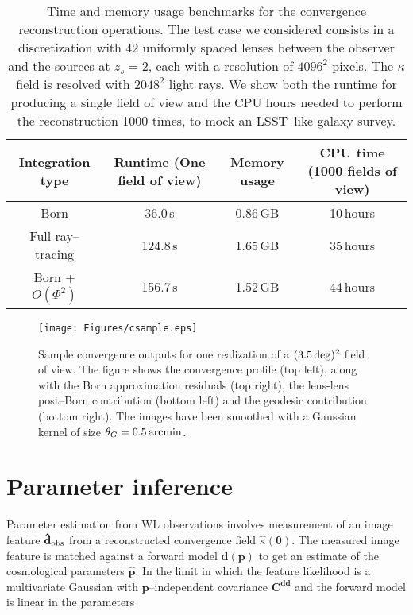 \documentclass[reprint,aps,prd,superscriptaddress,showkeys,showpacs]{revtex4-1}
\newcommand{\bb}[1]{\mathbf{#1}}
\newcommand{\bbh}[1]{\mathbf{\hat{#1}}}
\newcommand{\h}[1]{\hat{#1}}
\newcommand\pt{\pmb{\theta}}
\begin{document}
\begin{table*}
\begin{center}

\begin{tabular}{c|c|c|c}

\textbf{Integration type} & \textbf{Runtime (One field of view)} & \textbf{Memory usage} & \textbf{CPU time (1000 fields of view)} \\ \hline \hline
Born & 36.0\,s & 0.86\,GB & 10\,hours  \\
Full ray--tracing & 124.8\,s & 1.65\,GB & 35\,hours  \\
Born + $O(\Phi^2)$ & 156.7\,s & 1.52\,GB & 44\,hours \\ \hline

\end{tabular}

\end{center}

\caption{Time and memory usage benchmarks for the convergence reconstruction operations. The test case we considered consists in a discretization with 42 uniformly spaced lenses between the observer and the sources at $z_s=2$, each with a resolution of $4096^2$ pixels. The $\kappa$ field is resolved with $2048^2$ light rays. We show both the runtime for producing a single field of view and the CPU hours needed to perform the reconstruction 1000 times, to mock an LSST--like galaxy survey.}
\label{tab:benchmarks}

\end{table*}

\begin{figure*}
\begin{center}
\texttt{[image: Figures/csample.eps]}
\end{center}
\caption{Sample convergence outputs for one realization of a $(3.5\,{\rm deg})^2$ field of view. The figure shows the convergence profile (top left), along with the Born approximation residuals (top right), the lens-lens post--Born contribution (bottom left) and the geodesic contribution (bottom right). The images have been smoothed with a Gaussian kernel of size $\theta_G=0.5\,{\rm arcmin}$.}
\label{fig:csample}
\end{figure*} 


\section{Parameter inference}
% 
Parameter estimation from WL observations involves measurement of an image feature $\bbh{d}_{\rm obs}$ from a reconstructed convergence field $\h{\kappa}(\pt)$. The measured image feature is matched against a forward model $\bb{d}(\bb{p})$ to get an estimate of the cosmological parameters $\bbh{p}$. In the limit in which the feature likelihood is a multivariate Gaussian with $\bb{p}$--independent covariance $\bb{C}^{\bb{d}\bb{d}}$ and the forward model is linear in the parameters 
\end{document}
